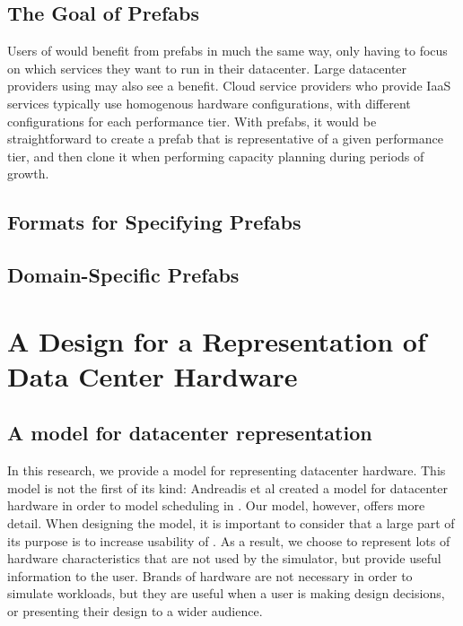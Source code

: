 \documentclass[11pt]{article}
\begin{document}
	\subsection{The Goal of Prefabs}
		Users of \opendc{} would benefit from prefabs in much the same way, only having to focus on which services they want to run in their datacenter.
		Large datacenter providers using \opendc{} may also see a benefit. 
		Cloud service providers who provide IaaS services typically use homogenous hardware configurations, with different configurations for each performance tier. 
		With prefabs, it would be straightforward to create a prefab that is representative of a given performance tier, and then clone it when performing capacity planning during periods of growth.
	
	\subsection{Formats for Specifying Prefabs}

	\subsection{Domain-Specific Prefabs}


\section{A Design for a Representation of Data Center Hardware}

	\subsection{A model for datacenter representation}
		In this research, we provide a model for representing datacenter hardware. 
		This model is not the first of its kind: Andreadis et al created a model for datacenter hardware in order to model scheduling in \opendc{} \cite{Andreadis2018}. 
		Our model, however, offers more detail. 
		When designing the model, it is important to consider that a large part of its purpose is to increase usability of \opendc{}. 
		As a result, we choose to represent lots of hardware characteristics that are not used by the simulator, but provide useful information to the user. 
		Brands of hardware are not necessary in order to simulate workloads, but they are useful when a user is making design decisions, or presenting their design to a wider audience.
	
\end{document}
